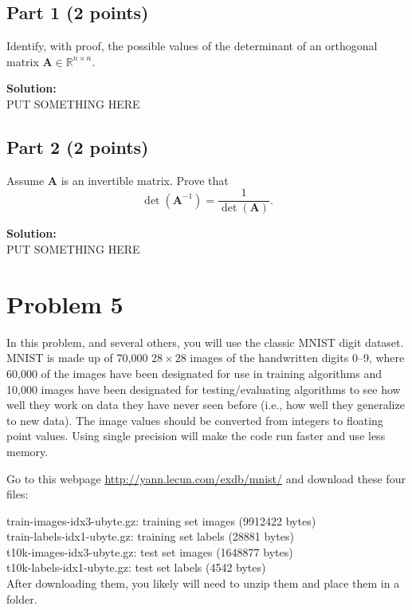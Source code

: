 \documentclass[11pt, oneside]{article}   	%
\begin{document}
\subsection*{Part 1 (2 points)}
Identify, with proof, the possible values of the determinant of an orthogonal matrix ${\mathbf{A}} \in \mathbb{R}^{n \times n}.$

\textbf{Solution:}\\
PUT SOMETHING HERE 

\subsection*{Part 2 (2 points)}

Assume $\mathbf{A}$ is an invertible matrix. Prove that \[
\det \left( {{\mathbf{A}}^{ - 1} } \right) = \frac{1}
{{\det \left( {{\mathbf{A}} } \right)}}.
\]

\textbf{Solution:}\\
PUT SOMETHING HERE 

\section*{Problem 5}
In this problem, and several others, you will use the classic MNIST digit dataset. MNIST is made up of 70,000 $28 \times 28$ images of the handwritten digits 0--9, where 60,000 of the images have been designated for use in training algorithms and 10,000 images have been designated for testing/evaluating algorithms to see how well they work on data they have never seen before (i.e., how well they generalize to new data). The image values should be converted from integers to floating point values. Using single precision will make the code run faster and use less memory.

Go to this webpage \url{http://yann.lecun.com/exdb/mnist/} and download these four files:

train-images-idx3-ubyte.gz:  training set images (9912422 bytes) \\
train-labels-idx1-ubyte.gz:  training set labels (28881 bytes) \\
t10k-images-idx3-ubyte.gz:   test set images (1648877 bytes) \\
t10k-labels-idx1-ubyte.gz:   test set labels (4542 bytes) \\

After downloading them, you likely will need to unzip them and place them in a folder. 
\end{document}
